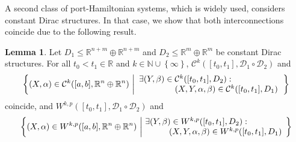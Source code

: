 \documentclass[preprint,12pt]{elsarticle}
\theoremstyle{definition}
\newtheorem{lemma}[theorem]{Lemma}
\newcommand{\set}[1]{\left\lbrace #1\right\rbrace}
\begin{document}
A second class of port-Hamiltonian systems, which is widely used, considers constant Dirac structures. In that case, we show that both interconnections coincide due to the following result.

\begin{lemma}\label{lem:constant_case}
Let $D_1\leq \mathbb{R}^{n+m}\oplus\mathbb{R}^{n+m}$ and $D_2\leq\mathbb{R}^m\oplus\mathbb{R}^m$ be constant Dirac structures. For all $t_0<t_1\in\mathbb{R}$ and $k\in\mathbb{N}\cup\set{\infty}$, $\mathcal{C}^k([t_0,t_1],\mathcal{D}_1\circ\mathcal{D}_2)$ and
\begin{align*}
\set{(X,\alpha)\in\mathcal{C}^k([a,b],\mathbb{R}^n\oplus\mathbb{R}^n)\,\left\vert
\begin{array}{l}
\exists (Y,\beta)\in\mathcal{C}^k([t_0,t_1],D_2):\\
\hspace*{1.5cm}(X,Y,\alpha,\beta)\in\mathcal{C}^k([t_0,t_1],D_1)
\end{array}
\right.}
\end{align*}
coincide, and $W^{k,p}([t_0,t_1],\mathcal{D}_1\circ\mathcal{D}_2)$ and
\begin{align*}
\set{(X,\alpha)\in W^{k,p}([a,b],\mathbb{R}^n\oplus\mathbb{R}^n)\,\left\vert
\!\begin{array}{l}
\exists (Y,\beta)\in W^{k,p}([t_0,t_1],D_2):\\
\hspace*{1cm}(X,Y,\alpha,\beta)\in W^{k,p}([t_0,t_1],D_1)
\end{array}
\right.\!}
\end{align*}
\end{lemma}
\end{document}
